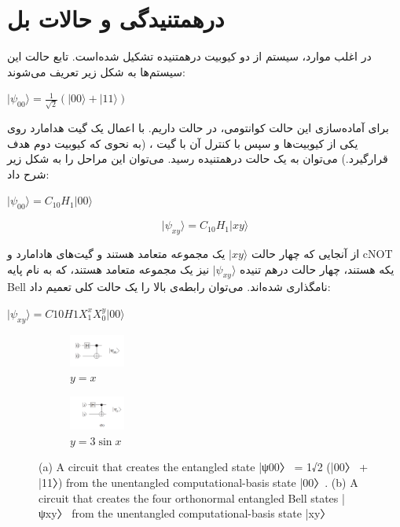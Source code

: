\documentclass{book}
\begin{document}
\section{درهمتنیدگی و حالات بل}
در اغلب موارد، سیستم از دو کیوبیت درهمتنیده تشکیل شده‌است. تابع حالت این سیستم‌ها به شکل زیر تعریف می‌شوند:
\begin{center}
	$\vert \psi_{00} \rangle = \frac{1}{\sqrt{2}}(|00\rangle + |11\rangle)$
\end{center}
برای آماده‌سازی این حالت کوانتومی‌، در حالت  داریم. با اعمال یک گیت هدامارد روی یکی از کیوبیت‌ها و سپس با کنترل‌ آن با گیت ، (به نحوی که کیوبیت دوم هدف قرارگیرد.) می‌توان به یک حالت درهمتنیده رسید. می‌توان این مراحل را به شکل زیر شرح داد:
\begin{center}
	$\vert\psi_{00}\rangle = C_{10}H_{1}\vert00\rangle$
\end{center}

\[
\vert\psi_{xy}\rangle = C_{10}H_{1}\vert xy \rangle
\]

از آنجایی که چهار حالت $\vert xy\rangle$ یک مجموعه متعامد هستند و گیت‌های هادامارد و cNOT یکه هستند، چهار حالت درهم تنیده $\vert \psi_{xy}\rangle$ نیز یک مجموعه متعامد هستند، که به نام پایه Bell نامگذاری شده‌اند.  می‌توان رابطه‌ی بالا را یک حالت کلی تعمیم داد:

\begin{center}
$\vert \psi_{xy}\rangle = C10H1X^{x}_{1} X^{y}_{0} \vert00\rangle$\\
\end{center}

\begin{figure}
	\centering
	\begin{subfigure}[b]{}
		\centering
		\includegraphics[width=0.2\textwidth]{psi00.png}
		\caption{$y=x$}
		\label{fig:y equals x}
	\end{subfigure}
	\hfill
	\begin{subfigure}[b]{}
		\centering
		\includegraphics[width=0.2\textwidth]{psixy.png}
		\caption{$y=3\sin x$}
		\label{fig:three sin x}
	\end{subfigure}
	\caption{(a) A circuit that creates the entangled state
		|ψ00〉 = 1√2
		(|00〉 + |11〉) from the unentangled computational-basis
		state |00〉. (b) A circuit that creates the four orthonormal entangled
		Bell states |ψxy〉 from the unentangled computational-basis state |xy〉}
	\label{fig:three graphs}
\end{figure}
\end{document}
